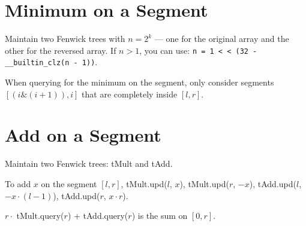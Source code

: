 \section*{Minimum on a Segment}

Maintain two Fenwick trees with $n = 2^k$ — one for the original array and the other for the reversed array. If $n > 1$, you can use:
\texttt{n = 1 <\,< (32 - \_\_builtin\_clz(n - 1))}.

When querying for the minimum on the segment, only consider segments $[(i \& (i + 1)), i]$ that are completely inside $[l, r]$.

\section*{Add on a Segment}

Maintain two Fenwick trees: tMult and tAdd.

To add $x$ on the segment $[l, r]$, tMult.upd($l$, $x$), tMult.upd($r$, $-x$),
tAdd.upd($l$, $-x \cdot (l - 1)$), tAdd.upd($r$, $x \cdot r$).

$r \cdot$ tMult.query($r$) + tAdd.query($r$) is the sum on $[0, r]$.
